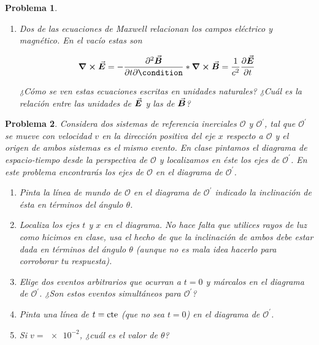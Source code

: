 \documentclass[12pt]{article}
\theoremstyle{break}
\newtheorem{exercise}{Problema}
\theoremstyle{nonumberbreak}
\newcommand*{\observer}{\mathcal{O}}
\newcommand*{\primeobserver}{\mathcal{O}^{\prime}}
\begin{document}
\begin{exercise}
\begin{enumerate}[label = \alph*)]
            \item Dos de las ecuaciones de Maxwell relacionan los campos eléctrico y magnético. En el vacío estas son
            
            \begin{dmath}
                \curl{\va*{E}} = -\pdv{\va*{B}}{t} \condition*{\curl{\va*{B}} = \dfrac{1}{c^{2}} \displaystyle\pdv{\va*{E}}{t}}
            \end{dmath}

            ¿Cómo se ven estas ecuaciones escritas en unidades naturales? ¿Cuál es la relación entre las unidades de \(\va*{E}\) y las de \(\va*{B}\)?
        \end{enumerate}
    \end{exercise}

    \begin{exercise}
        Considera dos sistemas de referencia inerciales \(\observer\) y \(\primeobserver\), tal que \(\primeobserver\) se mueve con velocidad \(v\) en la dirección positiva del eje \(x\) respecto a \(\observer\) y el origen de ambos sistemas es el mismo evento. En clase pintamos el diagrama de espacio-tiempo desde la perspectiva de \(\observer\) y localizamos en éste los ejes de \(\primeobserver\). En este problema encontrarás los ejes de \(\observer\) en el diagrama de \(\primeobserver\).

        \begin{enumerate}[label = \alph*)]
            \item Pinta la línea de mundo de \(\observer\) en el diagrama de \(\primeobserver\) indicado la inclinación de ésta en términos del ángulo \(\theta\).
            \item Localiza los ejes \(t\) y \(x\) en el diagrama. No hace falta que utilices rayos de luz como hicimos en clase, usa el hecho de que la inclinación de ambos debe estar dada en términos del ángulo \(\theta\) (aunque no es mala idea hacerlo para corroborar tu respuesta).
            \item Elige dos eventos arbitrarios que ocurran a \(t = 0\) y márcalos en el diagrama de \(\primeobserver\). ¿Son estos eventos simultáneos para \(\primeobserver\)?
            \item Pinta una línea de \(t = \textnormal{cte}\) (que no sea \(t = 0\)) en  el diagrama de \(\primeobserver\).
            \item Si \(v = \num{e-2}\), ¿cuál es el valor de \(\theta\)? 
        \end{enumerate}
    \end{exercise}
\end{document}
